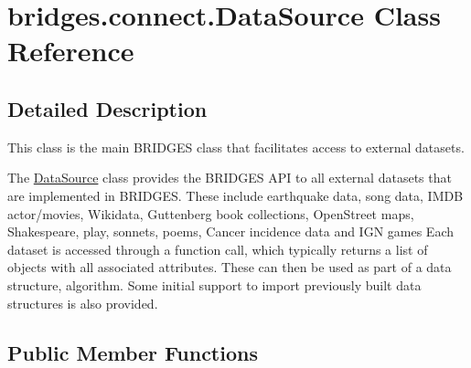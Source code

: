 \hypertarget{classbridges_1_1connect_1_1_data_source}{}\section{bridges.\+connect.\+Data\+Source Class Reference}
\label{classbridges_1_1connect_1_1_data_source}


\subsection{Detailed Description}
This class is the main B\+R\+I\+D\+G\+ES class that facilitates access to external datasets. 

The \hyperlink{classbridges_1_1connect_1_1_data_source}{Data\+Source} class provides the B\+R\+I\+D\+G\+ES A\+PI to all external datasets that are implemented in B\+R\+I\+D\+G\+ES. These include earthquake data, song data, I\+M\+DB actor/movies, Wikidata, Guttenberg book collections, Open\+Street maps, Shakespeare, play, sonnets, poems, Cancer incidence data and I\+GN games Each dataset is accessed through a function call, which typically returns a list of objects with all associated attributes. These can then be used as part of a data structure, algorithm. Some initial support to import previously built data structures is also provided. \subsection*{Public Member Functions}
